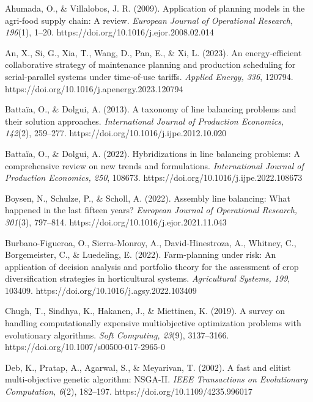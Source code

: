 \documentclass[]{interact}
\begin{document}
\begin{thebibliography}{}
\small
\setlength{\itemsep}{-1pt}

Ahumada, O., \& Villalobos, J. R. (2009). Application of planning models in the agri-food supply chain: A review. \emph{European Journal of Operational Research, 196}(1), 1--20. https://doi.org/10.1016/j.ejor.2008.02.014

An, X., Si, G., Xia, T., Wang, D., Pan, E., \& Xi, L. (2023). An energy-efficient collaborative strategy of maintenance planning and production scheduling for serial-parallel systems under time-of-use tariffs. \emph{Applied Energy, 336}, 120794. https://doi.org/10.1016/j.apenergy.2023.120794

Batta\"ia, O., \& Dolgui, A. (2013). A taxonomy of line balancing problems and their solution approaches. \emph{International Journal of Production Economics, 142}(2), 259--277. https://doi.org/10.1016/j.ijpe.2012.10.020

Batta\"ia, O., \& Dolgui, A. (2022). Hybridizations in line balancing problems: A comprehensive review on new trends and formulations. \emph{International Journal of Production Economics, 250}, 108673. https://doi.org/10.1016/j.ijpe.2022.108673

Boysen, N., Schulze, P., \& Scholl, A. (2022). Assembly line balancing: What happened in the last fifteen years? \emph{European Journal of Operational Research, 301}(3), 797--814. https://doi.org/10.1016/j.ejor.2021.11.043

Burbano-Figueroa, O., Sierra-Monroy, A., David-Hinestroza, A., Whitney, C., Borgemeister, C., \& Luedeling, E. (2022). Farm-planning under risk: An application of decision analysis and portfolio theory for the assessment of crop diversification strategies in horticultural systems. \emph{Agricultural Systems, 199}, 103409. https://doi.org/10.1016/j.agsy.2022.103409

Chugh, T., Sindhya, K., Hakanen, J., \& Miettinen, K. (2019). A survey on handling computationally expensive multiobjective optimization problems with evolutionary algorithms. \emph{Soft Computing, 23}(9), 3137--3166. https://doi.org/10.1007/s00500-017-2965-0

Deb, K., Pratap, A., Agarwal, S., \& Meyarivan, T. (2002). A fast and elitist multi-objective genetic algorithm: NSGA-II. \emph{IEEE Transactions on Evolutionary Computation, 6}(2), 182--197. https://doi.org/10.1109/4235.996017


\end{thebibliography}
\end{document}
